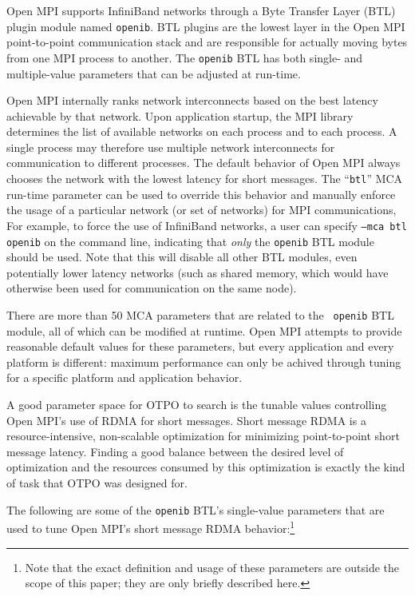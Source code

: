 \label{sec:motivation}

Open MPI supports InfiniBand networks through a Byte Transfer Layer
(BTL) plugin module named {\tt openib}.  BTL plugins are the lowest
layer in the Open MPI point-to-point communication stack and are
responsible for actually moving bytes from one MPI process to
another.  The {\tt openib} BTL has both single- and multiple-value
parameters that can be adjusted at run-time.

Open MPI internally ranks network interconnects based on the best
latency achievable by that network.  Upon application startup, the MPI
library determines the list of available networks on each process and
to each process.  A single process may therefore use multiple network
interconnects for communication to different processes.  The default
behavior of Open MPI always chooses the network with the lowest
latency for short messages.  The ``{\tt btl}'' MCA run-time parameter
can be used to override this behavior and manually enforce the usage
of a particular network (or set of networks) for MPI communications,
For example, to force the use of InfiniBand networks, a user can
specify {\tt --mca btl openib} on the command line, indicating that
{\em only} the {\tt openib} BTL module should be used.  Note that this
will disable all other BTL modules, even potentially lower latency
networks (such as shared memory, which would have otherwise been used
for communication on the same node).

There are more than 50 MCA parameters that are related to the {\tt
  openib} BTL module, all of which can be modified at runtime.  Open
MPI attempts to provide reasonable default values for these
parameters, but every application and every platform is different:
maximum performance can only be achived through tuning for a specific
platform and application behavior.

A good parameter space for OTPO to search is the tunable values
controlling Open MPI's use of RDMA for short messages.  Short message
RDMA is a resource-intensive, non-scalable optimization for minimizing
point-to-point short message latency.  Finding a good balance between
the desired level of optimization and the resources consumed by this
optimization is exactly the kind of task that OTPO was designed for.

The following are some of the {\tt openib} BTL's single-value
parameters that are used to tune Open MPI's short message RDMA
behavior:\footnote{Note that the exact definition and usage of these
  parameters are outside the scope of this paper; they are only
  briefly described here.}

